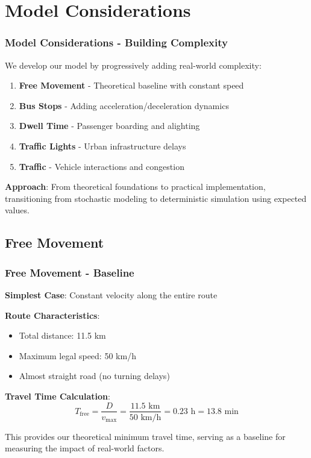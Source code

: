 \documentclass[12pt]{beamer}
\begin{document}
\section{Model Considerations}
\begin{frame}
\frametitle{Model Considerations - Building Complexity}
We develop our model by progressively adding real-world complexity:

\vspace{0.5cm}
\begin{enumerate}
\item \textbf{Free Movement} - Theoretical baseline with constant speed
\item \textbf{Bus Stops} - Adding acceleration/deceleration dynamics
\item \textbf{Dwell Time} - Passenger boarding and alighting
\item \textbf{Traffic Lights} - Urban infrastructure delays
\item \textbf{Traffic} - Vehicle interactions and congestion
\end{enumerate}

\vspace{0.5cm}
\textbf{Approach}: From theoretical foundations to practical implementation, transitioning from stochastic modeling to deterministic simulation using expected values.
\end{frame}

\subsection{Free Movement}
\begin{frame}
\frametitle{Free Movement - Baseline}
\textbf{Simplest Case}: Constant velocity along the entire route

\vspace{0.3cm}
\textbf{Route Characteristics}:
\begin{itemize}
\item Total distance: 11.5 km
\item Maximum legal speed: 50 km/h
\item Almost straight road (no turning delays)
\end{itemize}

\vspace{0.3cm}
\textbf{Travel Time Calculation}:
\begin{equation}
T_{\text{free}} = \frac{D}{v_{\text{max}}} = \frac{11.5 \text{ km}}{50 \text{ km/h}} = 0.23 \text{ h} = 13.8 \text{ min}
\end{equation}

\vspace{0.3cm}
This provides our theoretical minimum travel time, serving as a baseline for measuring the impact of real-world factors.
\end{frame}
\end{document}

